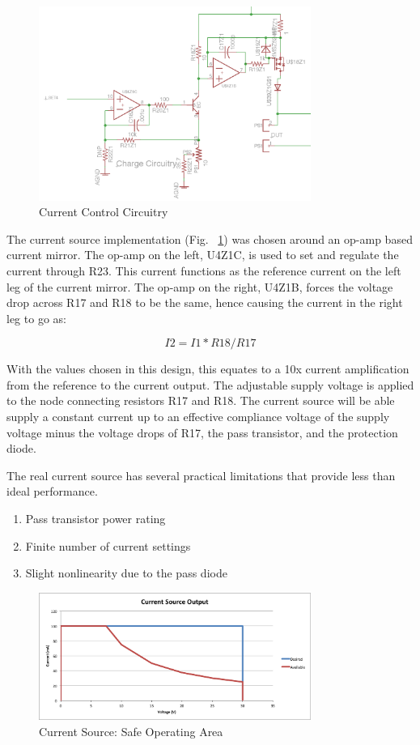 \documentclass[journal]{IEEEtran}
\begin{document}
\begin{figure}[here]
\centering
\includegraphics[width=3.5in]{currentMirror}
\caption{Current Control Circuitry}
\label{fig:currentMirror}
\end{figure}


The current source implementation (Fig. ~\ref{fig:currentMirror}) was chosen around an op-amp based current mirror. The op-amp on the left, U4Z1C, is used to set and regulate the current through R23. This current functions as the reference current on the left leg of the current mirror. The op-amp on the right, U4Z1B, forces the voltage drop across R17 and R18 to be the same, hence causing the current in the right leg to go as:

\begin{equation}
I2 = I1*R18/R17
\end{equation}

With the values chosen in this design, this equates to a 10x current amplification from the reference to the current output. The adjustable supply voltage is applied to the node connecting resistors R17 and R18. The current source will be able supply a constant current up to an effective compliance voltage of the supply voltage minus the voltage drops of R17, the pass transistor, and the protection diode.

The real current source has several practical limitations that provide less than ideal performance. 

\begin{enumerate}
\item Pass transistor power rating
\item Finite number of current settings
\item Slight nonlinearity due to the pass diode
\end{enumerate}

 
\begin{figure}[here]
\centering
\includegraphics[width=3.5in]{safeOpArea}
\caption{Current Source: Safe Operating Area}
\label{fig:safeOpArea}
\end{figure}
\end{document}
